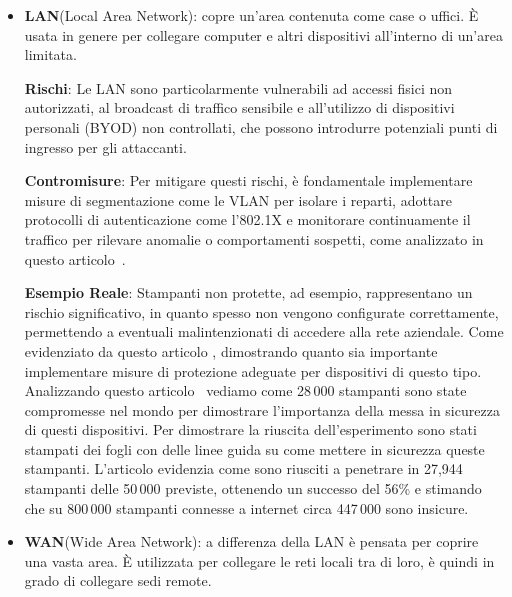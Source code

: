             \newpage
            \begin{itemize}
            \item \textbf{LAN}(Local Area Network): copre un'area contenuta come 
            case o uffici. È usata in genere per collegare computer e altri 
            dispositivi all'interno di un'area limitata.

            \subitem \textbf{Rischi}: Le LAN sono particolarmente vulnerabili ad 
            accessi fisici non autorizzati, al broadcast di traffico sensibile e 
            all'utilizzo di dispositivi personali (BYOD) non controllati, che 
            possono introdurre potenziali punti di ingresso per gli attaccanti.

            \subitem \textbf{Contromisure}: Per mitigare questi rischi, è 
            fondamentale implementare misure di segmentazione come le VLAN per 
            isolare i reparti, adottare protocolli di autenticazione come l’802.1X 
            e monitorare continuamente il traffico per rilevare anomalie o 
            comportamenti sospetti, come analizzato in questo articolo~\cite{how_to_print_sec}.

            \subitem \textbf{Esempio Reale}: Stampanti non protette, ad esempio, rappresentano un rischio significativo, in quanto spesso non vengono configurate correttamente, permettendo a eventuali malintenzionati di accedere alla rete aziendale. Come evidenziato da questo articolo \cite{vul_in_printers}, dimostrando quanto sia importante implementare misure di protezione adeguate per dispositivi di questo tipo.\\
            
            Analizzando questo articolo~\cite{printers_hijack} vediamo come 28\,000 stampanti sono state compromesse nel mondo per dimostrare l'importanza della messa in sicurezza di questi dispositivi. Per dimostrare la riuscita dell'esperimento sono stati stampati dei fogli con delle linee guida su come mettere in sicurezza queste stampanti. L'articolo evidenzia come sono riusciti a penetrare in 27,944 stampanti delle 50\,000 previste, ottenendo un successo del 56\% e stimando che su 800\,000 stampanti connesse a internet circa 447\,000 sono insicure.
            
            \item \textbf{WAN}(Wide Area Network): a differenza della LAN è pensata per coprire una vasta area. 
            È utilizzata per collegare le reti locali tra di loro, è quindi in grado di collegare sedi remote.


\end{itemize}
